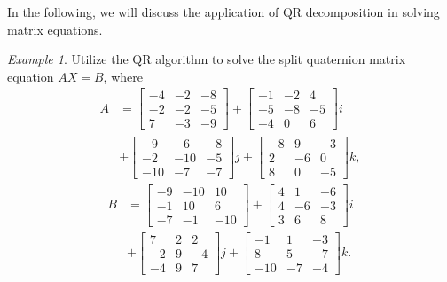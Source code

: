 \documentclass{book}
\theoremstyle{remark}
\newtheorem{example}{\it\indent Example}[section]
\begin{document}
\begin{multicols}{2}
In the following, we will discuss the application of QR decomposition in solving matrix equations.
\begin{example}
Utilize the QR algorithm to solve the split quaternion matrix equation $AX = B$, where
\begin{align*}
  A &=
    \begin{bmatrix}
    -4 & -2 & -8 \\
    -2 & -2 & -5 \\
     7 & -3 & -9
    \end{bmatrix} +
    \begin{bmatrix}
    -1 & -2 &  4 \\
    -5 & -8 & -5 \\
    -4 &  0 &  6
    \end{bmatrix} i \\
    &+ 
    \begin{bmatrix}
    -9  & -6  & -8 \\
    -2  & -10 & -5 \\
    -10 & -7  & -7
    \end{bmatrix} j +
    \begin{bmatrix}
    -8 &  9 & -3 \\
     2 & -6 &  0 \\
     8 &  0 & -5
    \end{bmatrix} k,
\end{align*}
\begin{align*}
  B &=
    \begin{bmatrix}
    -9 & -10 &  10 \\
    -1 &  10 &  6 \\
    -7 & -1  & -10
    \end{bmatrix} +
    \begin{bmatrix}
    4 &  1 & -6 \\
    4 & -6 & -3 \\
    3 &  6 &  8
    \end{bmatrix} i \\
    &+
    \begin{bmatrix}
     7 & 2 &  2 \\
    -2 & 9 & -4 \\
    -4 & 9 &  7
    \end{bmatrix} j +
    \begin{bmatrix}
    -1 &   1 & -3 \\
     8 &   5 & -7 \\
    -10 & -7 & -4
    \end{bmatrix} k.
\end{align*}
\end{example}  


\end{multicols}
\end{document}
